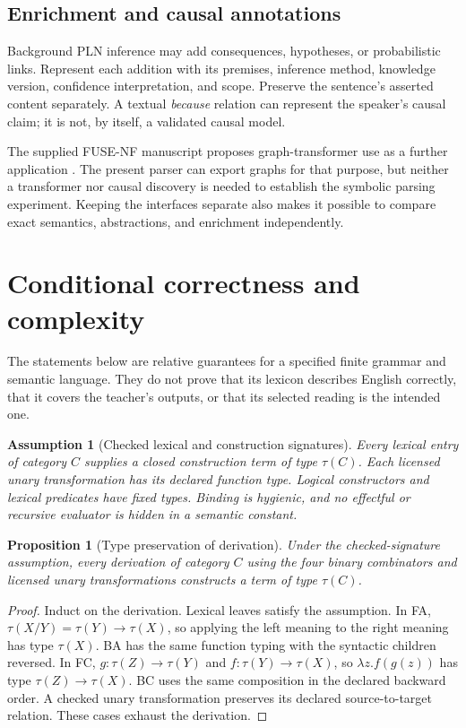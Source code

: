 \documentclass[11pt,a4paper]{article}
\newtheorem{proposition}[definition]{Proposition}
\newtheorem{assumption}[definition]{Assumption}
\begin{document}
\subsection{Enrichment and causal annotations}
Background PLN inference may add consequences, hypotheses, or probabilistic
links. Represent each addition with its premises, inference method, knowledge
version, confidence interpretation, and scope. Preserve the sentence's
asserted content separately. A textual \emph{because} relation can represent
the speaker's causal claim; it is not, by itself, a validated causal model.

The supplied FUSE-NF manuscript proposes graph-transformer use as a further
application \cite{senf}. The present parser can export graphs for that
purpose, but neither a transformer nor causal discovery is needed to
establish the symbolic parsing experiment. Keeping the interfaces separate
also makes it possible to compare exact semantics, abstractions, and
enrichment independently.

\section{Conditional correctness and complexity}\label{sec:theory}

The statements below are relative guarantees for a specified finite grammar
and semantic language. They do not prove that its lexicon describes English
correctly, that it covers the teacher's outputs, or that its selected reading
is the intended one.

\begin{assumption}[Checked lexical and construction signatures]
Every lexical entry of category \(C\) supplies a closed construction term
of type \(\tau(C)\). Each licensed unary transformation has its declared
function type. Logical constructors and lexical predicates have fixed types.
Binding is hygienic, and no effectful or recursive evaluator is hidden in a
semantic constant.
\end{assumption}

\begin{proposition}[Type preservation of derivation]\label{prop:typing}
Under the checked-signature assumption, every derivation of category \(C\)
using the four binary combinators and licensed unary transformations
constructs a term of type \(\tau(C)\).
\end{proposition}
\begin{proof}
Induct on the derivation. Lexical leaves satisfy the assumption. In FA,
\(\tau(X/Y)=\tau(Y)\to\tau(X)\), so applying the left meaning to the
right meaning has type \(\tau(X)\). BA has the same function typing with
the syntactic children reversed. In FC, \(g:\tau(Z)\to\tau(Y)\) and
\(f:\tau(Y)\to\tau(X)\), so \(\lambda z.f(g(z))\) has type
\(\tau(Z)\to\tau(X)\). BC uses the same composition in the declared
backward order. A checked unary transformation preserves its declared
source-to-target relation. These cases exhaust the derivation.
\end{proof}
\end{document}
